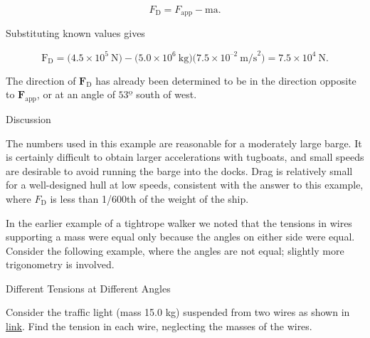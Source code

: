 \documentclass[
]{book}
\begin{document}
\leavevmode{}%
\[{F_{\text{D}} = {F_{\text{app}} - \text{ma}}}.\]

Substituting known values gives

\leavevmode{}%
\[{{\text{F}_{\text{D}} = (}4\text{.}{\text{5} \times \text{10}^{5}}\ \text{N}{) - (}5\text{.}{\text{0} \times \text{10}^{6}}\ \text{kg})(7\text{.}{\text{5} \times \text{10}^{\text{–2}}}\ \text{m/s}^{2}{) = 7}\text{.}{\text{5} \times \text{10}^{4}}\ \text{N}}.\]

The direction of \(\textbf{F}_{\text{D}}{}\) has already been determined
to be in the direction opposite to \(\textbf{F}_{\text{app}}{}\), or at an
angle of \(\text{53º}{}\) south of west.

{Discussion}

The numbers used in this example are reasonable for a moderately large
barge. It is certainly difficult to obtain larger accelerations with
tugboats, and small speeds are desirable to avoid running the barge into
the docks. Drag is relatively small for a well-designed hull at low
speeds, consistent with the answer to this example, where
\(F_{\text{D}}{}\) is less than 1/600th of the weight of the ship.

In the earlier example of a tightrope walker we noted that the tensions
in wires supporting a mass were equal only because the angles on either
side were equal. Consider the following example, where the angles are
not equal; slightly more trigonometry is involved.

\hypertarget{fs-id1348788}{}
Different Tensions at Different Angles

Consider the traffic light (mass 15.0 kg) suspended from two wires as
shown in \protect\hyperlink{import-auto-id3051538}{link}. Find
the tension in each wire, neglecting the masses of the wires.
\end{document}
